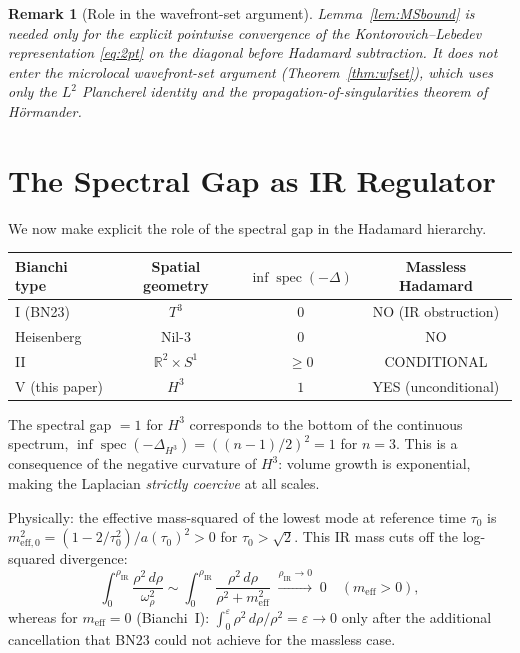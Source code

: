 \documentclass[12pt,letterpaper]{article}
\newtheorem{remark}[theorem]{Remark}
\newcommand{\Rbb}{\mathbb{R}}
\newcommand{\eps}{\varepsilon}
\DeclareMathOperator{\spec}{spec}
\begin{document}
\begin{remark}[Role in the wavefront-set argument]
\label{rem:MSbound_role}
Lemma~\ref{lem:MSbound} is needed only for the explicit pointwise
convergence of the Kontorovich--Lebedev representation \eqref{eq:2pt}
on the diagonal before Hadamard subtraction.  It does \emph{not} enter
the microlocal wavefront-set argument (Theorem~\ref{thm:wfset}),
which uses only the $L^{2}$ Plancherel identity and the
propagation-of-singularities theorem of H\"{o}rmander.
\end{remark}

\section{The Spectral Gap as IR Regulator}
\label{sec:spectral_gap}

We now make explicit the role of the spectral gap in the Hadamard hierarchy.

\begin{center}
\begin{tabular}{l|c|c|c}
\hline
Bianchi type & Spatial geometry & $\inf\spec(-\Delta)$ & Massless Hadamard \\
\hline
I (BN23) & $T^3$ & $0$ & NO (IR obstruction) \\
Heisenberg & Nil-3 & $0$ & NO \\
II & $\Rbb^2\times S^1$ & $\geq 0$ & CONDITIONAL \\
V (this paper) & $H^3$ & $1$ & YES (unconditional) \\
\hline
\end{tabular}
\end{center}

The spectral gap $= 1$ for $H^3$ corresponds to the bottom of the
continuous spectrum, $\inf\spec(-\Delta_{H^3}) = ((n-1)/2)^2 = 1$ for $n=3$.
This is a consequence of the negative curvature of $H^3$:
volume growth is exponential, making the Laplacian \emph{strictly
coercive} at all scales.

Physically: the effective mass-squared of the lowest mode at reference
time $\tau_0$ is $m_{\mathrm{eff},0}^2 = (1 - 2/\tau_0^2)/a(\tau_0)^2 > 0$
for $\tau_0 > \sqrt{2}$.
This IR mass cuts off the log-squared divergence:
\[
  \int_0^{\rho_{\mathrm{IR}}} \frac{\rho^2\,d\rho}{\omega_\rho^2}
  \sim \int_0^{\rho_{\mathrm{IR}}}
  \frac{\rho^2\,d\rho}{\rho^2 + m_{\mathrm{eff}}^2}
  \;\xrightarrow{\rho_{\mathrm{IR}}\to 0}\;
  0 \quad (m_{\mathrm{eff}} > 0),
\]
whereas for $m_{\mathrm{eff}} = 0$ (Bianchi~I):
$\int_0^{\eps} \rho^2\,d\rho/\rho^2 = \eps \to 0$ only after
the additional cancellation that BN23 \cite{BN23} could not achieve
for the massless case.
\end{document}
